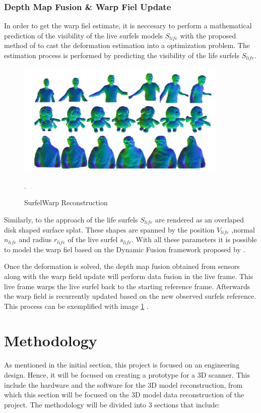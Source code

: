 \documentclass[12pt]{report}
\begin{document}
\subsection{Depth Map Fusion \& Warp Fiel Update}
In order to get the warp fiel estimate, it is neccesary to perform a mathematical prediction of the visibility of the live surfels models $S_{life}$ with the proposed method of 
to cast the deformation estimation into a optimization problem.
The estimation process is performed by predicting the visibility of the life surfels $S_{life}$.
\begin{figure}[h]%
  \centering
  \includegraphics[width=0.9\textwidth]{surfelwarp2.png}
  \caption{SurfelWarp Reconstruction}\cite[]{SurfelWarp}.
  \label{fig:surfelprocess}
\end{figure}

Similarly, to the approach of \citet{keller} the life surfels $S_{life}$  are rendered as an overlaped disk shaped surface splat. These shapes are spanned by the position $V_{life}$ 
,normal $n_{life}$ and radius $r_{life}$ of the live surfel $s_{life}$.
With all these parameters it is possible to model the warp fiel based on the Dynamic Fusion framework proposed by \citet*{newcombe_fox_seitz_2015}.

Once the deformation is solved, the depth map fusion obtained from sensors along with the warp field update will perform data fusion in the live frame. 
This live frame  warps the live surfel back to the starting reference frame. Afterwards the warp field is recurrently updated based on the new observed surfels reference. This process can be exemplified with image \ref{fig:surfelprocess} .

\chapter{Methodology}
As mentioned in the initial section, this project is focused on an engineering design. Hence, it will be focused on creating a prototype for a 3D scanner. 
This include the hardware and the software for the 3D model reconstruction, from which this section will be focused on the 3D model data reconstruction of the project.
The methodology will be divided into 3 sections that include: 
\end{document}
